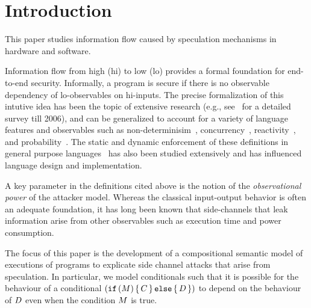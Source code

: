 \section{Introduction}

This paper studies information flow caused by speculation mechanisms
in hardware and software.

Information flow from high (hi) to low (lo) provides a formal
foundation for end-to-end security.  Informally, a program is secure
if there is no observable dependency of lo-observables on hi-inputs.
The precise formalization of this intutive idea has been the topic of
extensive research (e.g., see~\cite{Sabelfeld:2006:LIS:2312191.2314769}  for a detailed survey till
2006), and can be generalized to account for a variety of language
features and observables such as non-determinisim~\cite{Wittbold1990InformationFI},
concurrency~\cite{Smith:1998:SIF:268946.268975}, reactivity~\cite{O'Neill:2006:ISI:1155442.1155677}, and
probability~\cite{Gray:1992:TMF:2699806.2699811}. The static and dynamic enforcement
of these definitions in general purpose languages~\cite{myers-popl99} has also
been studied extensively and has influenced language design and
implementation.

A key parameter in the definitions cited above is the notion of
the \emph{observational power} of the attacker model. Whereas the classical
input-output behavior is often an adequate foundation,
it has long been known that side-channels that leak
information arise from other observables such as execution time and
power consumption.

The focus of this paper is the development of a compositional semantic model of
executions of programs to explicate side channel attacks that arise
from speculation. In particular, we model conditionals such that it is
possible for the behaviour of a conditional
$(\texttt{if}\,(M)\,\{\, C \,\}\,\texttt{else}\,\{\, D \,\})$ to depend on the behaviour
of $D$ even when the condition $M$ is true.

